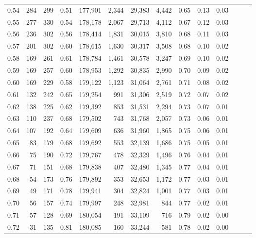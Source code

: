 \begin{tabular}{rrrrrrrrrrrrrr}
0.54 &    284 &  299 &  0.51 &  177,901 &    2,344 &  29,383 &   4,442 &  0.65 &  0.13 &      0.03 \\
0.55 &    277 &  330 &  0.54 &  178,178 &    2,067 &  29,713 &   4,112 &  0.67 &  0.12 &      0.03 \\
0.56 &    236 &  302 &  0.56 &  178,414 &    1,831 &  30,015 &   3,810 &  0.68 &  0.11 &      0.03 \\
0.57 &    201 &  302 &  0.60 &  178,615 &    1,630 &  30,317 &   3,508 &  0.68 &  0.10 &      0.02 \\
0.58 &    169 &  261 &  0.61 &  178,784 &    1,461 &  30,578 &   3,247 &  0.69 &  0.10 &      0.02 \\
0.59 &    169 &  257 &  0.60 &  178,953 &    1,292 &  30,835 &   2,990 &  0.70 &  0.09 &      0.02 \\
0.60 &    169 &  229 &  0.58 &  179,122 &    1,123 &  31,064 &   2,761 &  0.71 &  0.08 &      0.02 \\
0.61 &    132 &  242 &  0.65 &  179,254 &      991 &  31,306 &   2,519 &  0.72 &  0.07 &      0.02 \\
0.62 &    138 &  225 &  0.62 &  179,392 &      853 &  31,531 &   2,294 &  0.73 &  0.07 &      0.01 \\
0.63 &    110 &  237 &  0.68 &  179,502 &      743 &  31,768 &   2,057 &  0.73 &  0.06 &      0.01 \\
0.64 &    107 &  192 &  0.64 &  179,609 &      636 &  31,960 &   1,865 &  0.75 &  0.06 &      0.01 \\
0.65 &     83 &  179 &  0.68 &  179,692 &      553 &  32,139 &   1,686 &  0.75 &  0.05 &      0.01 \\
0.66 &     75 &  190 &  0.72 &  179,767 &      478 &  32,329 &   1,496 &  0.76 &  0.04 &      0.01 \\
0.67 &     71 &  151 &  0.68 &  179,838 &      407 &  32,480 &   1,345 &  0.77 &  0.04 &      0.01 \\
0.68 &     54 &  173 &  0.76 &  179,892 &      353 &  32,653 &   1,172 &  0.77 &  0.03 &      0.01 \\
0.69 &     49 &  171 &  0.78 &  179,941 &      304 &  32,824 &   1,001 &  0.77 &  0.03 &      0.01 \\
0.70 &     56 &  157 &  0.74 &  179,997 &      248 &  32,981 &     844 &  0.77 &  0.02 &      0.01 \\
0.71 &     57 &  128 &  0.69 &  180,054 &      191 &  33,109 &     716 &  0.79 &  0.02 &      0.00 \\
0.72 &     31 &  135 &  0.81 &  180,085 &      160 &  33,244 &     581 &  0.78 &  0.02 &      0.00 \\

\end{tabular}
